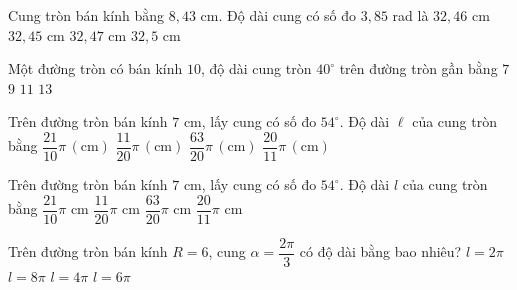 \begin{ex}%
	Cung tròn bán kính bằng $8{,}43$ cm. Độ dài cung có số đo $3{,}85$ rad là 
	\choice 
		 {\True $32{,}46$ cm}
		{$32{,}45$ cm} 
		{$32{,}47$  cm}
		{$32{,}5$ cm} 
\end{ex}

\begin{ex}%
	Một đường tròn có bán kính $10$, độ dài cung tròn $40^{\circ}$ trên đường  tròn gần bằng
	\choice 
		 {\True $7$}
		{$9$} 
		 {$11$}
		 {$13$}
\end{ex}

\begin{ex}%
	Trên đường tròn  bán kính $7$ cm, lấy cung có số đo $54^{\circ}$. Độ dài $\ell$ của cung tròn bằng
	 \choice
		 {\True $\dfrac{21}{10} \pi\,(\mathrm{cm})$}
		 {$\dfrac{11}{20} \pi\,(\mathrm{cm})$}
		 {$\dfrac{63}{20} \pi\,(\mathrm{cm})$}
		 {$\dfrac{20}{11} \pi\,(\mathrm{cm})$}
\end{ex}

\begin{ex}%
	Trên đường tròn bán kính $7$ cm, lấy cung có số  đo $54^{\circ}$. Độ dài $l$ của cung tròn bằng
	\choice 
		{\True  $\dfrac{21}{10} \pi$ cm}
		{$\dfrac{11}{20} \pi$  cm}
		{$\dfrac{63}{20} \pi$ cm} 
		{$\dfrac{20}{11} \pi$ cm} 
\end{ex}

\begin{ex}%
	 Trên đường tròn bán kính $R=6$, cung $\alpha=\dfrac{2\pi}{3}$ có độ dài bằng bao nhiêu?
	\choice 
		{$l=2\pi$} 
		{$l=8\pi$} 
		{\True  $l=4\pi$}
		 {$l=6\pi$}
\end{ex}


